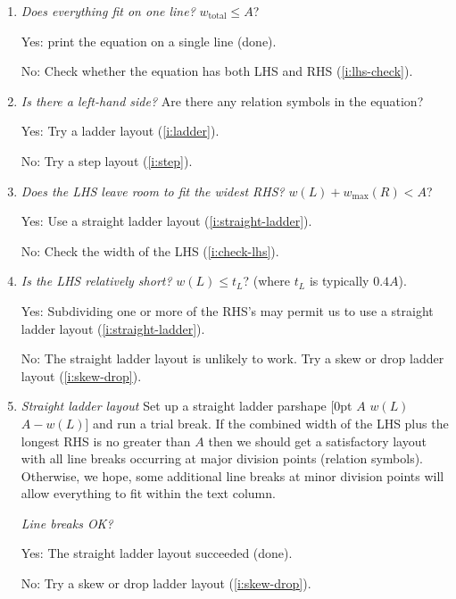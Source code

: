 \documentclass[twocolumn]{article}
\newcommand{\ititle}[1]{\textit{#1}}
\begin{document}
\newpage
\begin{small}
\begin{enumerate}
\renewcommand{\labelenumi}{(\theenumi)}
\item \ititle{Does everything fit on one line?}\label{i:LR}
  $w_{\mathrm{total}}\leq A$?

Yes: print the equation on a single line (done).

No: Check whether the equation has both LHS and RHS (\ref{i:lhs-check}).

\item \ititle{Is there a left-hand side?}\label{i:lhs-check}
Are there any relation symbols in the equation?

Yes: Try a ladder layout (\ref{i:ladder}).

No: Try a step layout (\ref{i:step}).

\item\ititle{Does the LHS leave room to fit the widest RHS?}\label{i:ladder}
  $w(L)+w_{\max}(R)<A$?

Yes: Use a straight ladder layout (\ref{i:straight-ladder}).

No: Check the width of the LHS (\ref{i:check-lhs}).

\item\ititle{Is the LHS relatively short?}\label{i:check-lhs}
$w(L)\leq t_L$? (where $t_L$ is typically $0.4A$).

Yes: Subdividing one or more of the RHS's may permit us to use a
straight ladder layout (\ref{i:straight-ladder}).

No: The straight ladder layout is unlikely to work.
Try a skew or drop ladder layout (\ref{i:skew-drop}).

\item\ititle{Straight ladder layout}\label{i:straight-ladder}
Set up a straight ladder parshape [0pt $A$ $w(L)$ $A-w(L)$] and run
a trial break. If the combined width of the LHS plus the longest RHS is
no greater than $A$ then we should get a satisfactory layout with all
line breaks occurring at major division points (relation symbols).
Otherwise, we hope, some additional line breaks at minor division points
will allow everything to fit within the text column.

\ititle{Line breaks OK?}

\begingroup {}
Yes: The straight ladder layout succeeded
  (done).\par\endgroup

No: Try a skew or drop ladder layout (\ref{i:skew-drop}).


\end{enumerate}
\end{small}
\end{document}
